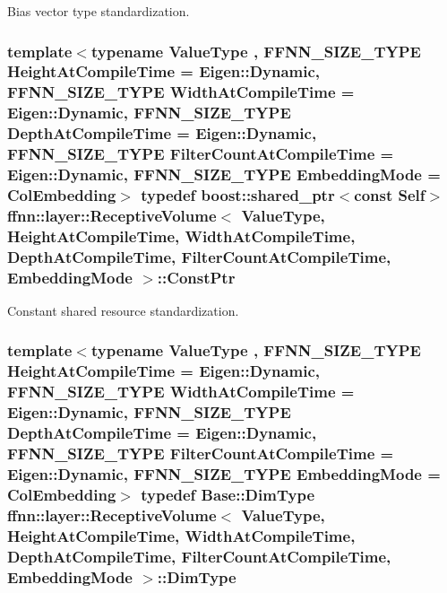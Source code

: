 Bias vector type standardization. 

\hypertarget{classffnn_1_1layer_1_1_receptive_volume_ad3e48c66c8bc1b5f3bc20dc8c75f2c64}{
\subsubsection[{Const\-Ptr}]{\setlength{\rightskip}{0pt plus 5cm}template$<$typename Value\-Type , F\-F\-N\-N\-\_\-\-S\-I\-Z\-E\-\_\-\-T\-Y\-P\-E Height\-At\-Compile\-Time = Eigen\-::\-Dynamic, F\-F\-N\-N\-\_\-\-S\-I\-Z\-E\-\_\-\-T\-Y\-P\-E Width\-At\-Compile\-Time = Eigen\-::\-Dynamic, F\-F\-N\-N\-\_\-\-S\-I\-Z\-E\-\_\-\-T\-Y\-P\-E Depth\-At\-Compile\-Time = Eigen\-::\-Dynamic, F\-F\-N\-N\-\_\-\-S\-I\-Z\-E\-\_\-\-T\-Y\-P\-E Filter\-Count\-At\-Compile\-Time = Eigen\-::\-Dynamic, F\-F\-N\-N\-\_\-\-S\-I\-Z\-E\-\_\-\-T\-Y\-P\-E Embedding\-Mode = Col\-Embedding$>$ typedef boost\-::shared\-\_\-ptr$<$const {\bf Self}$>$ {\bf ffnn\-::layer\-::\-Receptive\-Volume}$<$ Value\-Type, Height\-At\-Compile\-Time, Width\-At\-Compile\-Time, Depth\-At\-Compile\-Time, Filter\-Count\-At\-Compile\-Time, {\bf Embedding\-Mode} $>$\-::{\bf Const\-Ptr}}}\label{classffnn_1_1layer_1_1_receptive_volume_ad3e48c66c8bc1b5f3bc20dc8c75f2c64}


Constant shared resource standardization. 

\hypertarget{classffnn_1_1layer_1_1_receptive_volume_ab0bd7607040aa08bf9cdfcc30e2794ef}{
\subsubsection[{Dim\-Type}]{\setlength{\rightskip}{0pt plus 5cm}template$<$typename Value\-Type , F\-F\-N\-N\-\_\-\-S\-I\-Z\-E\-\_\-\-T\-Y\-P\-E Height\-At\-Compile\-Time = Eigen\-::\-Dynamic, F\-F\-N\-N\-\_\-\-S\-I\-Z\-E\-\_\-\-T\-Y\-P\-E Width\-At\-Compile\-Time = Eigen\-::\-Dynamic, F\-F\-N\-N\-\_\-\-S\-I\-Z\-E\-\_\-\-T\-Y\-P\-E Depth\-At\-Compile\-Time = Eigen\-::\-Dynamic, F\-F\-N\-N\-\_\-\-S\-I\-Z\-E\-\_\-\-T\-Y\-P\-E Filter\-Count\-At\-Compile\-Time = Eigen\-::\-Dynamic, F\-F\-N\-N\-\_\-\-S\-I\-Z\-E\-\_\-\-T\-Y\-P\-E Embedding\-Mode = Col\-Embedding$>$ typedef Base\-::\-Dim\-Type {\bf ffnn\-::layer\-::\-Receptive\-Volume}$<$ Value\-Type, Height\-At\-Compile\-Time, Width\-At\-Compile\-Time, Depth\-At\-Compile\-Time, Filter\-Count\-At\-Compile\-Time, {\bf Embedding\-Mode} $>$\-::{\bf Dim\-Type}}}\label{classffnn_1_1layer_1_1_receptive_volume_ab0bd7607040aa08bf9cdfcc30e2794ef}


